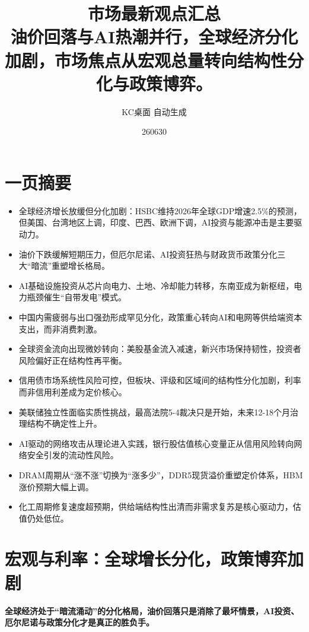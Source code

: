 \documentclass[11pt]{ctexart}
\title{\textbf{市场最新观点汇总}\\[0.4em]{\large 油价回落与AI热潮并行，全球经济分化加剧，市场焦点从宏观总量转向结构性分化与政策博弈。}}
\author{KC桌面 自动生成}
\date{260630}
\begin{document}
\maketitle
\tableofcontents
\newpage
\section{一页摘要}
\begin{itemize}
  \item 全球经济增长放缓但分化加剧：HSBC维持2026年全球GDP增速2.5\%的预测，但美国、台湾地区上调，印度、巴西、欧洲下调，AI投资与能源冲击是主要驱动力。
  \item 油价下跌缓解短期压力，但厄尔尼诺、AI投资狂热与财政货币政策分化三大“暗流”重塑增长格局。
  \item AI基础设施投资从芯片向电力、土地、冷却能力转移，东南亚成为新枢纽，电力瓶颈催生“自带发电”模式。
  \item 中国内需疲弱与出口强劲形成罕见分化，政策重心转向AI和电网等供给端资本支出，而非消费刺激。
  \item 全球资金流向出现微妙转向：美股基金流入减速，新兴市场保持韧性，投资者风险偏好正在结构性再平衡。
  \item 信用债市场系统性风险可控，但板块、评级和区域间的结构性分化加剧，利率而非信用利差成为定价核心。
  \item 美联储独立性面临实质性挑战，最高法院5-4裁决只是开始，未来12-18个月治理结构不确定性上升。
  \item AI驱动的网络攻击从理论进入实践，银行股估值核心变量正从信用风险转向网络安全引发的流动性风险。
  \item DRAM周期从“涨不涨”切换为“涨多少”，DDR5现货溢价重塑定价体系，HBM涨价预期大幅上调。
  \item 化工周期修复速度超预期，供给端结构性出清而非需求复苏是核心驱动力，估值仍处低位。
\end{itemize}
\section{宏观与利率：全球增长分化，政策博弈加剧}
\textbf{全球经济处于“暗流涌动”的分化格局，油价回落只是消除了最坏情景，AI投资、厄尔尼诺与政策分化才是真正的胜负手。}
\end{document}
